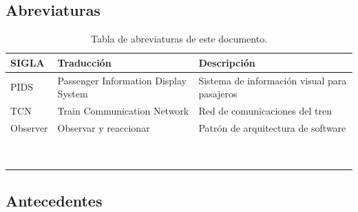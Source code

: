 \documentclass[
11pt, %
]{charter}
\begin{document}
\subsection{Abreviaturas}
\label{sec:abreviaturas}


\begin{table}[h!]
\begin{tabular}{|l|l|l|}
\hline
SIGLA & Traducción                           & Descripción                                  \\ \hline
PIDS  & Passenger Information Display System & Sistema de información visual para pasajeros \\ \hline
TCN   & Train Communication Network          & Red de comunicaciones del tren               \\ \hline
 Observer     & Observar y reaccionar                                     & Patrón de arquitectura de software                          \\ \hline
      &                                      &                                              \\ \hline
      &                                      &                                              \\ \hline
      &                                      &                                              \\ \hline
      &                                      &                                              \\ \hline
      &                                      &                                              \\ \hline
      &                                      &                                              \\ \hline
      &                                      &                                              \\ \hline
      &                                      &                                              \\ \hline
      &                                      &                                              \\ \hline
\end{tabular}
\caption{Tabla de abreviaturas de este documento.}
\label{table:abreviaturas}
\end{table}


\pagebreak

\subsection{Antecedentes}
\end{document}
